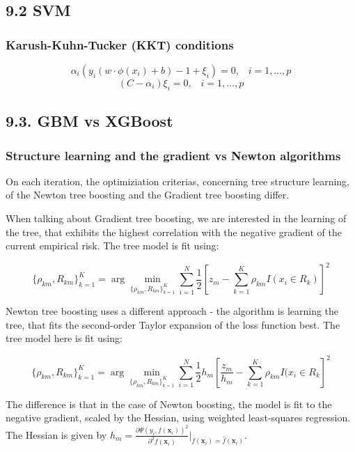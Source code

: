 \documentclass[12pt,]{article}
\begin{document}
\hypertarget{svm}{%
\subsection{9.2 SVM}\label{svm}}

\hypertarget{karush-kuhn-tucker-kkt-conditions}{%
\subsubsection{Karush-Kuhn-Tucker (KKT)
conditions}\label{karush-kuhn-tucker-kkt-conditions}}

\[\alpha_i(y_i(w\cdot\phi(x_i)+b)-1+\xi_i)=0,\;\;\;i=1,...,p\]
\[(C-\alpha_i)\xi_i=0,\;\;\;i=1,...,p\]

\hypertarget{gbm-vs-xgboost}{%
\subsection{9.3. GBM vs XGBoost}\label{gbm-vs-xgboost}}

\hypertarget{structure-learning-and-the-gradient-vs-newton-algorithms}{%
\subsubsection{Structure learning and the gradient vs Newton
algorithms}\label{structure-learning-and-the-gradient-vs-newton-algorithms}}

On each iteration, the optimiziation criterias, concerning tree
structure learning, of the Newton tree boosting and the Gradient tree
boosting differ.

When talking about Gradient tree boosting, we are interested in the
learning of the tree, that exhibits the highest correlation with the
negative gradient of the current empirical risk. The tree model is fit
using:

\[\{\rho_{km}, R_{km}\}_{k=1}^{K}=\arg\min_{\{\rho_{km}, R_{km}\}_{k=1}^{K}}\sum_{i=1}^{N}\frac{1}{2}[z_{m}-\sum_{k=1}^{K}\rho_{km}I(x_{i}\in R_k)]^2\]

Newton tree boosting uses a different approach - the algorithm is
learning the tree, that fits the second-order Taylor expansion of the
loss function best. The tree model here is fit using:

\[\{\rho_{km}, R_{km}\}_{k=1}^{K}=\arg\min_{\{\rho_{km}, R_{km}\}_{k=1}^{K}}\sum_{i=1}^{N}\frac{1}{2}h_m[\frac{z_m}{h_m}-\sum_{k=1}^{K}\rho_{km}I(x_{i}\in R_k]^2\]

The difference is that in the case of Newton boosting, the model is fit
to the negative gradient, scaled by the Hessian, using weighted
least-squares regression. The Hessian is given by
\(h_m = \frac{\partial{\Psi(y_{i},f(\mathbf{x}_i))}^{2}}{\partial^{2}{f(\mathbf{x}_i)}}\rvert_{f(\mathbf{x}_i)=\widehat{f}(\mathbf{x}_i)}\).
\end{document}
